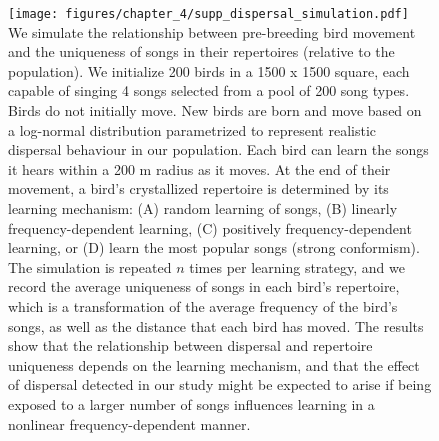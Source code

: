 \documentclass[9pt, onecolumn, twoside, lineno]{gsajnl}
\begin{document}
\begin{figure}[tbp]
    \centering
    \texttt{[image: figures/chapter\_4/supp\_dispersal\_simulation.pdf]}
    {
        We simulate the relationship between pre-breeding bird movement and the uniqueness of songs in their repertoires  (relative to the population). We initialize 200 birds in a 1500 x 1500 square, each capable of singing 4 songs selected from
        a pool of 200 song types. Birds do not initially move. New birds are born and move based on a log-normal distribution parametrized to represent realistic dispersal behaviour in our population. Each bird can learn the songs it hears within a 200 m radius as it moves. At the end of their movement, a bird's crystallized repertoire is determined by its learning mechanism: (A) random learning of songs, (B) linearly frequency-dependent learning, (C) positively frequency-dependent learning, or (D) learn the most popular songs (strong conformism). The simulation is repeated $n$ times per learning strategy, and we record the average uniqueness of songs in each bird's repertoire, which is a transformation of the average frequency of the bird's songs, as well as the distance that each bird has moved. The results show that the relationship between dispersal and repertoire uniqueness depends on the learning mechanism, and that the effect of dispersal detected in our study might be expected to arise if being exposed to a larger number of songs influences learning in a nonlinear frequency-dependent manner.
    }
    \label{fig:supp_dispersal_simulation}
\end{figure}
\end{document}
